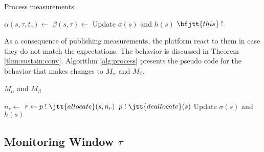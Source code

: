 % 
\begin{algorithm}
\caption{Process measurements}
\label{alg:publish}
\begin{algorithmic}
  \State $\alpha(s,\tau,t_c) \gets$ 
  \State $\beta(s,\tau) \gets$ 
  \State Update $\sigma(s)$ and $h(s)$
  \State $\bfjtt{this} \; ! \;$ 
\EndFunction
\end{algorithmic}
\end{algorithm}
% 


As a consequence of publishing measurements, the platform react to them in case they do not match the expectations.
The behavior is discussed in Theorem \ref{thm:sustain:conv}.
Algorithm \ref{alg:process} presents the pseudo code for the behavior that makes changes to $M_\alpha$ and $M_\beta$.

% 
\begin{algorithm}
\caption{$M_\alpha$ and $M_\beta$}
\label{alg:process}
\begin{algorithmic}
    \State $n_r \gets$ 
    \State $r \gets p \; ! \; \jtt{allocate}(s, n_r)$
  \EndIf
    \State $p \; ! \; \jtt{deallocate}(s)$
  \EndIf
  \State Update $\sigma(s)$ and $h(s)$
\EndFunction
\end{algorithmic}
\end{algorithm}


\subsection{Monitoring Window $\tau$}

